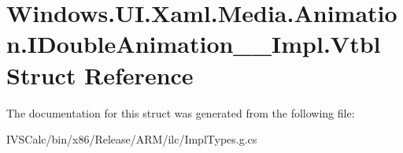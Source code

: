 \hypertarget{struct_windows_1_1_u_i_1_1_xaml_1_1_media_1_1_animation_1_1_i_double_animation_____impl_1_1_vtbl}{}\section{Windows.\+U\+I.\+Xaml.\+Media.\+Animation.\+I\+Double\+Animation\+\_\+\+\_\+\+Impl.\+Vtbl Struct Reference}
\label{struct_windows_1_1_u_i_1_1_xaml_1_1_media_1_1_animation_1_1_i_double_animation_____impl_1_1_vtbl}


The documentation for this struct was generated from the following file\+:\begin{DoxyCompactItemize}
\item 
I\+V\+S\+Calc/bin/x86/\+Release/\+A\+R\+M/ilc/Impl\+Types.\+g.\+cs\end{DoxyCompactItemize}
